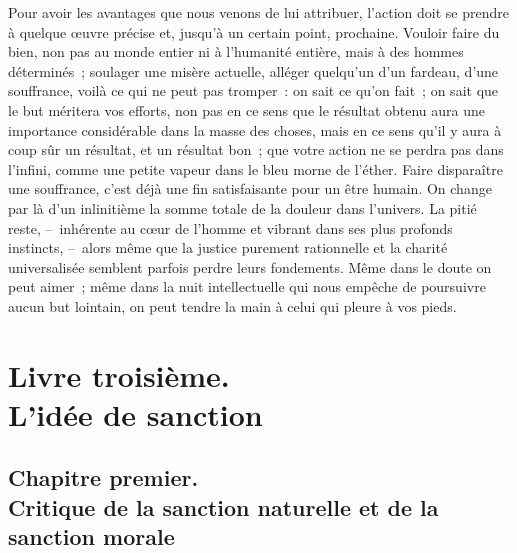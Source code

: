 \documentclass[french,twoside]{book} %
\begin{document}
Pour avoir les avantages que nous venons de lui attribuer, l’action doit se prendre à quelque œuvre précise et, jusqu’à un certain point, prochaine. Vouloir faire du bien, non pas au monde entier ni à l’humanité entière, mais à des hommes déterminés ; soulager une misère actuelle, alléger quelqu’un d’un fardeau, d’une souffrance, voilà ce qui ne peut pas tromper : on sait ce qu’on fait ; on sait que le but méritera vos efforts, non pas en ce sens que le résultat obtenu aura une importance considérable dans la masse des choses, mais en ce sens qu’il y aura à coup sûr un résultat, et un résultat bon ; que votre action ne se perdra pas dans l’infini, comme une petite vapeur dans le bleu morne de l’éther. Faire disparaître une souffrance, c’est déjà une fin satisfaisante pour un être humain. On change par là d’un inlinitième la somme totale de la douleur dans l’univers. La pitié reste, – inhérente au cœur de l’homme et vibrant dans ses plus profonds instincts, – alors même que la justice purement rationnelle et la charité universalisée semblent parfois perdre leurs fondements. Même dans le doute on peut aimer ; même dans la nuit intellectuelle qui nous empêche de poursuivre aucun but lointain, on peut tendre la main à celui qui pleure à vos pieds.
\section[{Livre troisième. L’idée de sanction}]{Livre troisième. \\
L’idée de sanction}\renewcommand{\leftmark}{Livre troisième. \\
L’idée de sanction}

\subsection[{Chapitre premier. Critique de la sanction naturelle et de la sanction morale}]{Chapitre premier. \\
Critique de la sanction naturelle et de la sanction morale}
\end{document}
